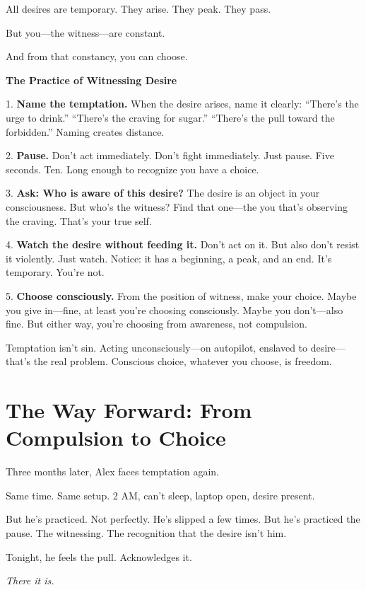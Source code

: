 \documentclass[11pt,twoside]{book}
\begin{document}
All desires are temporary. They arise. They peak. They pass.

But you—the witness—are constant.

And from that constancy, you can choose.

\begin{practicebox}
\textbf{The Practice of Witnessing Desire}

1. \textbf{Name the temptation.} When the desire arises, name it clearly: ``There's the urge to drink.'' ``There's the craving for sugar.'' ``There's the pull toward the forbidden.'' Naming creates distance.

2. \textbf{Pause.} Don't act immediately. Don't fight immediately. Just pause. Five seconds. Ten. Long enough to recognize you have a choice.

3. \textbf{Ask: Who is aware of this desire?} The desire is an object in your consciousness. But who's the witness? Find that one—the you that's observing the craving. That's your true self.

4. \textbf{Watch the desire without feeding it.} Don't act on it. But also don't resist it violently. Just watch. Notice: it has a beginning, a peak, and an end. It's temporary. You're not.

5. \textbf{Choose consciously.} From the position of witness, make your choice. Maybe you give in—fine, at least you're choosing consciously. Maybe you don't—also fine. But either way, you're choosing from awareness, not compulsion.

Temptation isn't sin. Acting unconsciously—on autopilot, enslaved to desire—that's the real problem. Conscious choice, whatever you choose, is freedom.
\end{practicebox}

\section*{The Way Forward: From Compulsion to Choice}

Three months later, Alex faces temptation again.

Same time. Same setup. 2 AM, can't sleep, laptop open, desire present.

But he's practiced. Not perfectly. He's slipped a few times. But he's practiced the pause. The witnessing. The recognition that the desire isn't him.

Tonight, he feels the pull. Acknowledges it.

\emph{There it is.}
\end{document}
